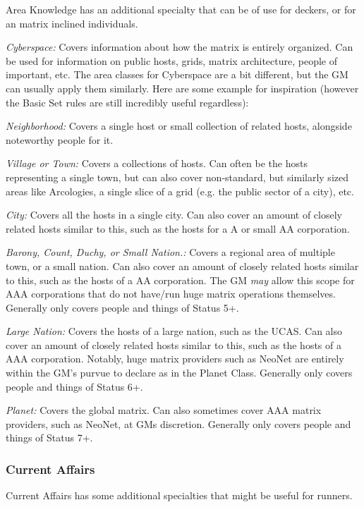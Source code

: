 \begin{multicols}{3}
	Area Knowledge has an additional specialty that can be of use for deckers, or for an matrix inclined individuals.
	
	\textit{Cyberspace:} Covers information about how the matrix is entirely organized. Can be used for information on public hosts, grids, matrix architecture, people of important, etc. The area classes for Cyberspace are a bit different, but the GM can usually apply them similarly. Here are some example for inspiration (however the Basic Set rules are still incredibly useful regardless):
	
	\textit{Neighborhood:} Covers a single host or small collection of related hosts, alongside noteworthy people for it.
	
	\textit{Village or Town:} Covers a collections of hosts. Can often be the hosts representing a single town, but can also cover non-standard, but similarly sized areas like Arcologies, a single slice of a grid (e.g. the public sector of a city), etc. 
	
	\textit{City:} Covers all the hosts in a single city. Can also cover an amount of closely related hosts similar to this, such as the hosts for a A or small AA corporation.
	
	\textit{Barony, Count, Duchy, or Small Nation.:} Covers a regional area of multiple town, or a small nation. Can also cover an amount of closely related hosts similar to this, such as the hosts of a AA corporation. The GM \textit{may} allow this scope for AAA corporations that do not have/run huge matrix operations themselves. Generally only covers people and things of Status 5+.
	
	\textit{Large Nation:} Covers the hosts of a large nation, such as the UCAS. Can also cover an amount of closely related hosts similar to this, such as the hosts of a AAA corporation. Notably, huge matrix providers such as NeoNet are entirely within the GM's purvue to declare as in the Planet Class. Generally only covers people and things of Status 6+.
	
	\textit{Planet:} Covers the global matrix. Can also sometimes cover AAA matrix providers, such as NeoNet, at GMs discretion. Generally only covers people and things of Status 7+.
	
	\subsubsection*{Current Affairs}
	
	Current Affairs has some additional specialties that might be useful for runners.
	

\end{multicols}
